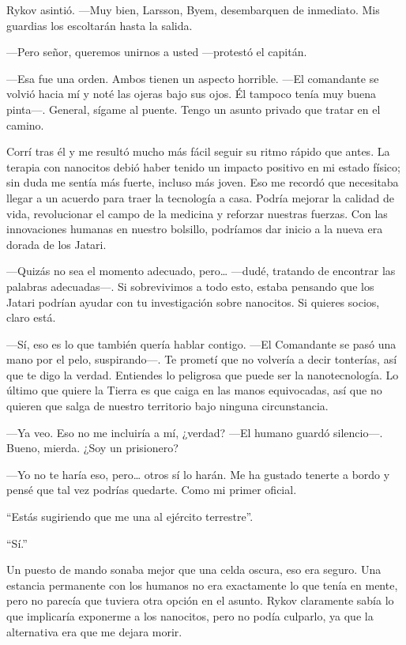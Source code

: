 Rykov asintió. —Muy bien, Larsson, Byem, desembarquen de inmediato. Mis guardias los escoltarán hasta la salida.

—Pero señor, queremos unirnos a usted —protestó el capitán.

—Esa fue una orden. Ambos tienen un aspecto horrible. —El comandante se volvió hacia mí y noté las ojeras bajo sus ojos. Él tampoco tenía muy buena pinta—. General, sígame al puente. Tengo un asunto privado que tratar en el camino.

Corrí tras él y me resultó mucho más fácil seguir su ritmo rápido que antes. La terapia con nanocitos debió haber tenido un impacto positivo en mi estado físico; sin duda me sentía más fuerte, incluso más joven. Eso me recordó que necesitaba llegar a un acuerdo para traer la tecnología a casa. Podría mejorar la calidad de vida, revolucionar el campo de la medicina y reforzar nuestras fuerzas. Con las innovaciones humanas en nuestro bolsillo, podríamos dar inicio a la nueva era dorada de los Jatari.

—Quizás no sea el momento adecuado, pero… —dudé, tratando de encontrar las palabras adecuadas—. Si sobrevivimos a todo esto, estaba pensando que los Jatari podrían ayudar con tu investigación sobre nanocitos. Si quieres socios, claro está.

—Sí, eso es lo que también quería hablar contigo. —El Comandante se pasó una mano por el pelo, suspirando—. Te prometí que no volvería a decir tonterías, así que te digo la verdad. Entiendes lo peligrosa que puede ser la nanotecnología. Lo último que quiere la Tierra es que caiga en las manos equivocadas, así que no quieren que salga de nuestro territorio bajo ninguna circunstancia.

—Ya veo. Eso no me incluiría a mí, ¿verdad? —El humano guardó silencio—. Bueno, mierda. ¿Soy un prisionero?

—Yo no te haría eso, pero… otros sí lo harán. Me ha gustado tenerte a bordo y pensé que tal vez podrías quedarte. Como mi primer oficial.

``Estás sugiriendo que me una al ejército terrestre''.

``Sí.''

Un puesto de mando sonaba mejor que una celda oscura, eso era seguro. Una estancia permanente con los humanos no era exactamente lo que tenía en mente, pero no parecía que tuviera otra opción en el asunto. Rykov claramente sabía lo que implicaría exponerme a los nanocitos, pero no podía culparlo, ya que la alternativa era que me dejara morir.

